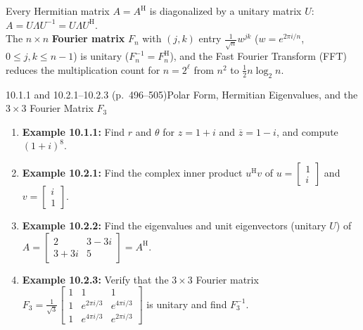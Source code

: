 \documentclass[11pt,a4paper,openany,oneside]{book}
\def\vect#1{#1}%
\def\mathbf#1{#1}%
\newcommand{\term}[1]{\textbf{\color{teal}#1}}
\newcommand{\vect}[1]{\mathbf{#1}}
\newcommand{\Herm}{\mathrm{H}}
\numberwithin{equation}{chapter}
\begin{document}
\begin{result}
Every Hermitian matrix $A = A^\Herm$ is diagonalized by a unitary matrix $U$: $A = U\Lambda U^{-1} = U\Lambda U^\Herm$.\\
The $n\times n$ \term{Fourier matrix} $F_n$ with $(j,k)$ entry $\frac{1}{\sqrt{n}}w^{jk}$ ($w = e^{2\pi i/n}$, $0 \le j,k \le n-1$) is unitary ($F_n^{-1} = F_n^\Herm$), and the Fast Fourier Transform (FFT) reduces the multiplication count for $n = 2^\ell$ from $n^2$ to $\frac{1}{2}n\log_2 n$.
\end{result}

\begin{example}{10.1.1 and 10.2.1--10.2.3 (p.\ 496--505)}{Polar Form, Hermitian Eigenvalues, and the $3\times 3$ Fourier Matrix $F_3$}
\begin{enumerate}
\item \textbf{Example 10.1.1:} Find $r$ and $\theta$ for $z = 1 + i$ and $\overline{z} = 1 - i$, and compute $(1+i)^8$.
\item \textbf{Example 10.2.1:} Find the complex inner product $\vect{u}^\Herm\vect{v}$ of $\vect{u} = \begin{bmatrix}1\\i\end{bmatrix}$ and $\vect{v} = \begin{bmatrix}i\\1\end{bmatrix}$.
\item \textbf{Example 10.2.2:} Find the eigenvalues and unit eigenvectors (unitary $U$) of $A = \begin{bmatrix}2 & 3-3i\\3+3i & 5\end{bmatrix} = A^\Herm$.
\item \textbf{Example 10.2.3:} Verify that the $3\times 3$ Fourier matrix $F_3 = \frac{1}{\sqrt{3}}\begin{bmatrix}1 & 1 & 1\\1 & e^{2\pi i/3} & e^{4\pi i/3}\\1 & e^{4\pi i/3} & e^{2\pi i/3}\end{bmatrix}$ is unitary and find $F_3^{-1}$.
\end{enumerate}
\end{example}
\end{document}
